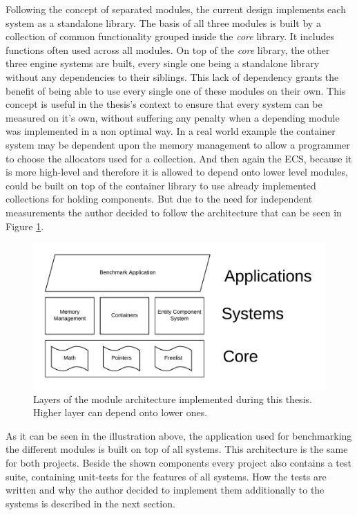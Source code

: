 Following the concept of separated modules, the current design implements each system as a standalone library. The basis of all three modules is built by a collection of common functionality grouped inside the \textit{core} library. It includes functions often used across all modules. On top of the \textit{core} library, the other three engine systems are built, every single one being a standalone library without any dependencies to their siblings. This lack of dependency grants the benefit of being able to use every single one of these modules on their own. This concept is useful in the thesis's context to ensure that every system can be measured on it's own, without suffering any penalty when a depending module was implemented in a non optimal way. In a real world example the container system may be dependent upon the memory management to allow a programmer to choose the allocators used for a collection. And then again the \ac{ECS}, because it is more high-level and therefore it is allowed to depend onto lower level modules, could be built on top of the container library to use already implemented collections for holding components. But due to the need for independent measurements the author decided to follow the architecture that can be seen in Figure \ref{fig:spark_arch}.

\begin{figure}[h!]
	\centering \includegraphics[width=\linewidth]{PICs/spark_arch.png}
	\caption{Layers of the module architecture implemented during this thesis. Higher layer can depend onto lower ones.}
	\label{fig:spark_arch}
\end{figure}

As it can be seen in the illustration above, the application used for benchmarking the different modules is built on top of all systems. This architecture is the same for both projects. Beside the shown components every project also contains a test suite, containing unit-tests for the features of all systems. How the tests are written and why the author decided to implement them additionally to the systems is described in the next section.


